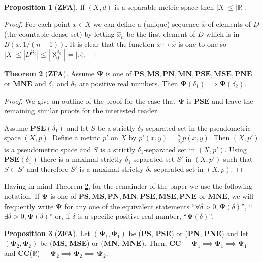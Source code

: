 \documentclass[11pt, reqno]{amsart}
\theoremstyle{definition}
\newtheorem{theorem}{Theorem}
\numberwithin{theorem}{section}
\theoremstyle{definition}
\theoremstyle{definition}
\theoremstyle{definition}
\theoremstyle{definition}
\theoremstyle{definition}
\numberwithin{claim}{section}
\theoremstyle{definition}
\newtheorem{proposition}[theorem]{Proposition}
\theoremstyle{definition}
\theoremstyle{definition}
\theoremstyle{definition}
\theoremstyle{definition}
\theoremstyle{remboldstyle}
\begin{document}
\begin{proposition}[\textbf{ZFA}] \label{P:XleR} 
If $(X,d)$ is a separable metric space then $|X| \le |\mathbb{R}|$.
\end{proposition}
\begin{proof}
For each point $x \in X$ we can define a (unique) sequence $\hat{x}$ of elements of $D$ (the countable dense set) by letting $\hat{x}_n$ be the first element of $D$ which is in $B(x,1/(n+1))$.  It is clear that the function $x \mapsto \hat{x}$ is one to one so $|X| \le |D^{\aleph_0}| \le |\aleph_0^{\aleph_0}| = |\mathbb{R}|$.
\end{proof}
\begin{theorem}[\textbf{ZFA}]
\label{T:DeltaDoesntMatter}
Assume $\mathbf{\Psi}$ is one of $\mathbf{PS, MS, PN, MN, PSE, MSE, PNE}$ or $\mathbf{MNE}$ and $\delta_1$ and $\delta_2$ are positive real numbers.  Then $\mathbf{\Psi}(\delta_1) \implies \mathbf{\Psi}(\delta_2)$.
\end{theorem}
\begin{proof}
We give an outline of the proof for the case that $\mathbf{\Psi}$ is $\mathbf{PSE}$ and leave the remaining similar proofs for the interested reader.  

Assume $\mathbf{PSE}(\delta_1)$ and let $S$ be a strictly $\delta_2$-separated set in the pseudometric space $(X,p)$. Define a metric $p'$ on $X$ by $p'(x,y) = \frac{ \delta_1}{ \delta_2}p(x,y) $.  Then $(X,p')$ is a pseudometric space and $S$ is a strictly $\delta_1$-separated set in $(X,p')$.  Using $\mathbf{PSE}(\delta_1)$ there is a maximal strictly $\delta_1$-separated set $S'$ in $(X,p')$ such that $S \subset S'$ and therefore $S'$ is a maximal strictly $\delta_2$-separated set in $(X,p)$.
\end{proof}
Having in mind Theorem \ref{T:DeltaDoesntMatter}, for the remainder of the paper we use the following notation. If $\mathbf{\Psi}$ is one of $\mathbf{PS, MS, PN, MN, PSE, MSE, PNE}$ or $\mathbf{MNE}$, we will frequently write $\mathbf{\Psi}$ for any one of the equivalent statements ``$\forall \delta > 0, \mathbf{\Psi}(\delta)$'', ``$\exists \delta > 0, \mathbf{\Psi}(\delta)$'' or, if $\delta$ is a specific positive real number, ``$\mathbf{\Psi}(\delta)$''.

\begin{proposition}[\textbf{ZFA}]\label{CCplusPsi}
Let $(\mathbf{\Psi}_1, \mathbf{\Phi}_1)$ be (\textbf{PS}, \textbf{PSE}) or (\textbf{PN}, \textbf{PNE}) and let $(\mathbf{\Psi}_2, \mathbf{\Phi}_2)$ be (\textbf{MS}, \textbf{MSE}) or (\textbf{MN}, \textbf{MNE}). Then, \textbf{CC} $+$ $\mathbf{\Psi}_1 \implies \mathbf{\Phi}_1 \implies \mathbf{\Psi}_1$ and \textbf{CC}($\mathbb{R}$) $+$ $\mathbf{\Psi}_2 \implies \mathbf{\Phi}_2 \implies \mathbf{\Psi}_2$.
\end{proposition}
\end{document}
